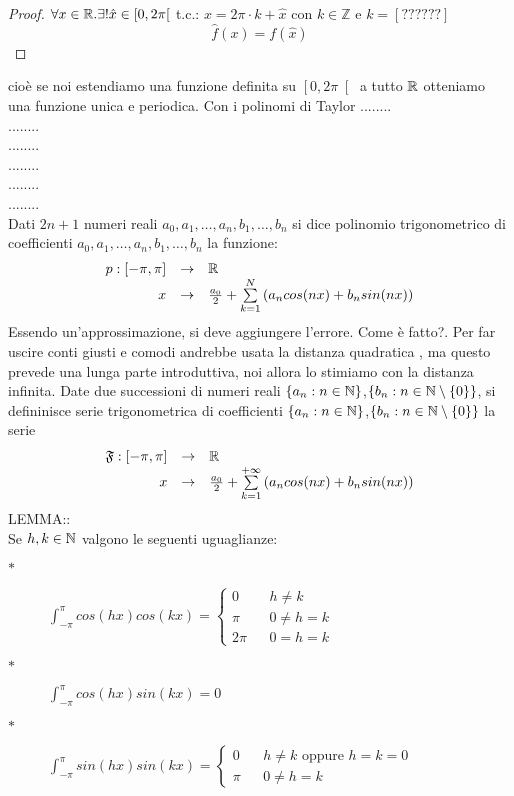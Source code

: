\begin{proof}
	$\forall x\in \mathbb{R}. \exists ! \hat{x}\in\left[0,2\pi\right[$ t.c.: $x=2\pi\cdot k+\hat{x}$ con $k\in\mathbb{Z}$ e $k=\left[??????\right]$\\
	\[\hat{f}(x)=f(\hat{x})\]
\end{proof}
cioè se noi estendiamo una funzione definita su $\left[0,2\pi\right[$ a tutto $ \mathbb{R}$ otteniamo una funzione unica e periodica.
\observation
Con i polinomi di Taylor ........\\
........\\
........\\
........\\
........\\
........\\
Dati $2n+1$ numeri reali $a_0,a_1,\dotsc,a_n,b_1,\dotsc,b_n$ si dice polinomio trigonometrico di coefficienti $a_0,a_1,\dotsc,a_n,b_1,\dotsc,b_n$ la funzione:
\[\begin{array}{rcl} p: \left[-\pi,\pi\right] & \to &  \mathbb{R} \\ x & \to & \frac{a_0}{2}+\sum\limits_{k=1}^{N}\left(a_ncos(nx)+b_nsin(nx)\right) \end{array}\]
\observation
Essendo un'approssimazione, si deve aggiungere l'errore. Come è fatto?. Per far uscire conti giusti e comodi andrebbe usata la distanza quadratica , ma questo prevede una lunga parte introduttiva, noi allora lo stimiamo con la distanza infinita.
Date due successioni di numeri reali $\left\{a_n:n\in\mathbb{N}\right\}$,$\left\{b_n:n\in\mathbb{N}\setminus\left\{0\right\}\right\}$, si defininisce serie trigonometrica di coefficienti  $\left\{a_n:n\in\mathbb{N}\right\}$,$\left\{b_n:n\in\mathbb{N}\setminus\left\{0\right\}\right\}$ la serie
\[\begin{array}{rcl} \mathfrak{F}: \left[-\pi,\pi\right] & \to &  \mathbb{R} \\ x & \to & \frac{a_0}{2}+\sum\limits_{k=1}^{+\infty}\left(a_ncos(nx)+b_nsin(nx)\right) \end{array}\]
LEMMA::\\
Se $h,k\in\mathbb{N}$ valgono le seguenti uguaglianze:
\begin{description}
	\item[$\ast$]
	$\int_{-\pi}^{\pi} cos(hx)cos(kx)=
	\left\{\begin{matrix}
	0 &&h\ne k\\\pi&&0\ne h=k\\2\pi&&0=h=k
	\end{matrix}\right.$
	\item[$\ast$] $\int_{-\pi}^{\pi}cos(hx)sin(kx)= 0 $
	\item[$\ast$]
	$\int_{-\pi}^{\pi}sin(hx)sin(kx)=
	\left\{\begin{matrix}
	0 &&h\ne k\text{ oppure }h=k=0\\ \pi&&0\ne h=k
	\end{matrix}\right.$
\end{description}
